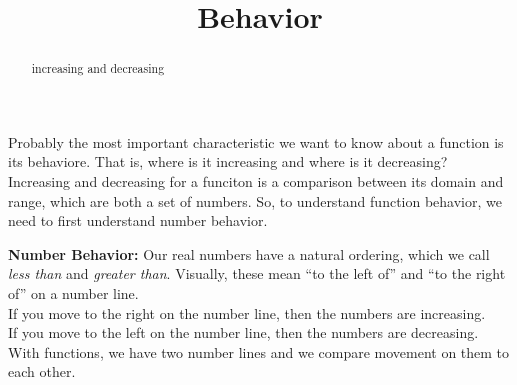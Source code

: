 \documentclass{ximera}
\title{Behavior}
\begin{document}
\begin{abstract}
increasing and decreasing
\end{abstract}
\maketitle



Probably the most important characteristic we want to know about a function is its behaviore.  That is, where is it increasing and where is it decreasing? \\




Increasing and decreasing for a funciton is a comparison between its domain and range, which are both a set of numbers.  So, to understand function behavior, we need to first understand number behavior.



\textbf{\textcolor{blue!55!black}{Number Behavior:}}  Our real numbers have a natural ordering, which we call \textit{less than} and \textit{greater than}.  Visually, these mean ``to the left of'' and ``to the right of'' on a number line. \\

If you move to the right on the number line, then the numbers are increasing. \\

If you move to the left on the number line, then the numbers are decreasing. \\











With functions, we have two number lines and we compare movement on them to each other. \\
\end{document}

